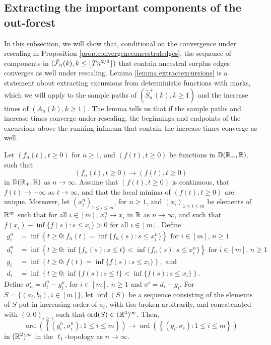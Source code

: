 \subsection{Extracting the important components of the out-forest}\label{subsec.componentswithancestral}
In this subsection, we will show that, conditional on the convergence under rescaling in Proposition \ref{prop.convergenceancestraledges}, the sequence of components in $(\hat{{\mathcal F}}_n(k),k\leq \lfloor T n^{2/3}\rfloor )$ that contain ancestral surplus edges converges as well under rescaling. Lemma \ref{lemma.extractexcursions} is a statement about extracting excursions from deterministic functions with marks, which we will apply to the sample paths of $(\hat{S}_n^{+}(k),k\geq 1)$ and the increase times of $(A_n(k),k\geq 1)$. The lemma tells us that if the sample paths and increase times converge under rescaling, the beginnings and endpoints of the excursions above the running infimum that contain the increase times converge as well. 
\begin{lemma}\label{lemma.extractexcursions}
Let $(f_n(t), t\geq 0)$ for $n\geq 1$, and $(f(t),t\geq 0)$ be functions in ${\mathbb D}({\mathbb R}_+,{\mathbb R})$, such that 
$$(f_n(t), t\geq 0)\to (f(t),t\geq 0)$$ in ${\mathbb D}({\mathbb R}_+,{\mathbb R})$ as $n\to \infty$. Assume that $(f(t),t\geq 0)$ is continuous, that $f(t)\to -\infty$ as $t\to \infty$, and that the local minima of $(f(t),t\geq 0)$ are unique. Moreover, let $(x_i^n)_{1\leq i\leq m}$, for $n\geq 1$, and $(x_i)_{1\leq i\leq m}$ be elements of ${\mathbb R}^{m}$ such that for all $i\in [m]$, $x_i^n\to x_i$ in ${\mathbb R}$ as $n\to \infty$, and such that $f(x_i)-\inf\{f(s):s\leq x_i\}>0$ for all $i\in [m]$. Define
\begin{align*}g_i^n&=\inf\left\{t\geq 0:f_n(t)=\inf\{f_n(s):s\leq x_i^n\}\right\}\text{ for }i\in [m]\text{, }n\geq 1\\
d_i^n&=\inf\left\{ t\geq 0: \inf\{f_n(s):s\leq t\} < \inf\{f_n(s):s\leq x_i^n\}\right\}\text{ for }i\in [m]\text{, }n\geq 1\\
g_i&=\inf\left\{t\geq 0:f(t)=\inf\{f(s):s\leq x_i\}\right\},\text{ and}\\
d_i&=\inf\left\{ t\geq 0: \inf\{f(s):s\leq t\} < \inf\{f(s):s\leq x_i\}\right\}.
\end{align*}
Define $\sigma^i_n=d_i^n-g_i^n$, for $i\in [m]$, $n\geq 1$ and $\sigma^i=d_i-g_i$. For $S=\{(a_i,b_i), i\in [m]\}$, let $\operatorname{ord}(S)$ be a sequence consisting of the elements of $S$ put in increasing order of $a_i$, with ties broken arbitrarily, and concatenated with $(0,0)_{i\geq 1}$ such that $\operatorname{ord}(S)\in ({\mathbb R}^3)^\infty$. Then, 
$$\operatorname{ord}\left(\left\{(g_i^n,\sigma_i^n):1\leq i \leq m\right\}\right)\to \operatorname{ord}\left(\left\{(g_i,\sigma_i):1\leq i \leq m\right\}\right)$$
in $({\mathbb R}^{2})^\infty$ in the $\ell_1$-topology as $n\to \infty$. 
\end{lemma}

